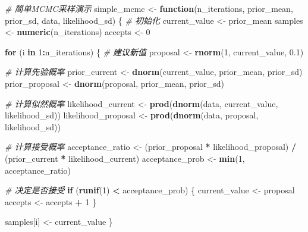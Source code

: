 \documentclass[
  twoside]{book}
\newenvironment{Shaded}{\begin{snugshade}}{\end{snugshade}}
\newcommand{\CommentTok}[1]{\textcolor[rgb]{0.56,0.35,0.01}{\textit{#1}}}
\newcommand{\ControlFlowTok}[1]{\textcolor[rgb]{0.13,0.29,0.53}{\textbf{#1}}}
\newcommand{\DecValTok}[1]{\textcolor[rgb]{0.00,0.00,0.81}{#1}}
\newcommand{\FloatTok}[1]{\textcolor[rgb]{0.00,0.00,0.81}{#1}}
\newcommand{\FunctionTok}[1]{\textcolor[rgb]{0.13,0.29,0.53}{\textbf{#1}}}
\newcommand{\NormalTok}[1]{#1}
\newcommand{\OtherTok}[1]{\textcolor[rgb]{0.56,0.35,0.01}{#1}}
\newcommand{\SpecialCharTok}[1]{\textcolor[rgb]{0.81,0.36,0.00}{\textbf{#1}}}
\begin{document}
\begin{Shaded}
\begin{Highlighting}[]
\CommentTok{\# 简单MCMC采样演示}
\NormalTok{simple\_mcmc }\OtherTok{\textless{}{-}} \ControlFlowTok{function}\NormalTok{(n\_iterations, prior\_mean, prior\_sd, data, likelihood\_sd) \{}
  \CommentTok{\# 初始化}
\NormalTok{  current\_value }\OtherTok{\textless{}{-}}\NormalTok{ prior\_mean}
\NormalTok{  samples }\OtherTok{\textless{}{-}} \FunctionTok{numeric}\NormalTok{(n\_iterations)}
\NormalTok{  accepts }\OtherTok{\textless{}{-}} \DecValTok{0}

  \ControlFlowTok{for}\NormalTok{ (i }\ControlFlowTok{in} \DecValTok{1}\SpecialCharTok{:}\NormalTok{n\_iterations) \{}
    \CommentTok{\# 建议新值}
\NormalTok{    proposal }\OtherTok{\textless{}{-}} \FunctionTok{rnorm}\NormalTok{(}\DecValTok{1}\NormalTok{, current\_value, }\FloatTok{0.1}\NormalTok{)}

    \CommentTok{\# 计算先验概率}
\NormalTok{    prior\_current }\OtherTok{\textless{}{-}} \FunctionTok{dnorm}\NormalTok{(current\_value, prior\_mean, prior\_sd)}
\NormalTok{    prior\_proposal }\OtherTok{\textless{}{-}} \FunctionTok{dnorm}\NormalTok{(proposal, prior\_mean, prior\_sd)}

    \CommentTok{\# 计算似然概率}
\NormalTok{    likelihood\_current }\OtherTok{\textless{}{-}} \FunctionTok{prod}\NormalTok{(}\FunctionTok{dnorm}\NormalTok{(data, current\_value, likelihood\_sd))}
\NormalTok{    likelihood\_proposal }\OtherTok{\textless{}{-}} \FunctionTok{prod}\NormalTok{(}\FunctionTok{dnorm}\NormalTok{(data, proposal, likelihood\_sd))}

    \CommentTok{\# 计算接受概率}
\NormalTok{    acceptance\_ratio }\OtherTok{\textless{}{-}}\NormalTok{ (prior\_proposal }\SpecialCharTok{*}\NormalTok{ likelihood\_proposal) }\SpecialCharTok{/}\NormalTok{ (prior\_current }\SpecialCharTok{*}\NormalTok{ likelihood\_current)}
\NormalTok{    acceptance\_prob }\OtherTok{\textless{}{-}} \FunctionTok{min}\NormalTok{(}\DecValTok{1}\NormalTok{, acceptance\_ratio)}

    \CommentTok{\# 决定是否接受}
    \ControlFlowTok{if}\NormalTok{ (}\FunctionTok{runif}\NormalTok{(}\DecValTok{1}\NormalTok{) }\SpecialCharTok{\textless{}}\NormalTok{ acceptance\_prob) \{}
\NormalTok{      current\_value }\OtherTok{\textless{}{-}}\NormalTok{ proposal}
\NormalTok{      accepts }\OtherTok{\textless{}{-}}\NormalTok{ accepts }\SpecialCharTok{+} \DecValTok{1}
\NormalTok{    \}}

\NormalTok{    samples[i] }\OtherTok{\textless{}{-}}\NormalTok{ current\_value}
\NormalTok{  \}}


\end{Highlighting}
\end{Shaded}
\end{document}
